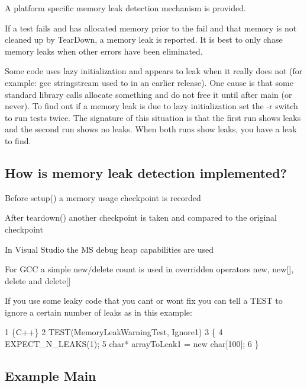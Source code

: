 \begin{DoxyItemize}
\item A platform specific memory leak detection mechanism is provided.
\item If a test fails and has allocated memory prior to the fail and that memory is not cleaned up by Tear\+Down, a memory leak is reported. It is best to only chase memory leaks when other errors have been eliminated.
\item Some code uses lazy initialization and appears to leak when it really does not (for example\+: gcc stringstream used to in an earlier release). One cause is that some standard library calls allocate something and do not free it until after main (or never). To find out if a memory leak is due to lazy initialization set the -\/r switch to run tests twice. The signature of this situation is that the first run shows leaks and the second run shows no leaks. When both runs show leaks, you have a leak to find.
\end{DoxyItemize}

\subsection*{How is memory leak detection implemented?}


\begin{DoxyItemize}
\item Before setup() a memory usage checkpoint is recorded
\item After teardown() another checkpoint is taken and compared to the original checkpoint
\item In Visual Studio the MS debug heap capabilities are used
\item For G\+CC a simple new/delete count is used in overridden operators new, new\mbox{[}\mbox{]}, delete and delete\mbox{[}\mbox{]}
\end{DoxyItemize}

If you use some leaky code that you can\textquotesingle{}t or won\textquotesingle{}t fix you can tell a T\+E\+ST to ignore a certain number of leaks as in this example\+:


\begin{DoxyCode}
1 \{C++\}
2 TEST(MemoryLeakWarningTest, Ignore1)
3 \{
4     EXPECT\_N\_LEAKS(1);
5     char* arrayToLeak1 = new char[100];
6 \}
\end{DoxyCode}


\subsection*{Example Main}


